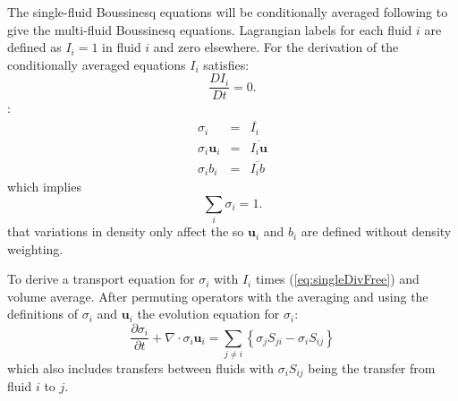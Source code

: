 \documentclass[draft]{agujournal2019}
\begin{document}
The single-fluid Boussinesq equations will be conditionally averaged following  to give the multi-fluid Boussinesq equations. Lagrangian labels for each fluid $i$ are defined as $I_i=1$ in fluid $i$ and zero elsewhere. 
For the derivation of the conditionally averaged equations   $I_i$ satisfies:
\begin{equation}
\frac{DI_i}{Dt}=0.
\label{eq:LagrangianLabel}
\end{equation}
:
\begin{eqnarray}
\sigma_i &=& \overline{I_i} \\
\sigma_i \mathbf{u}_i &=& \overline{I_i \mathbf{u}} \\
\sigma_i b_i &=& \overline{I_i b}
\label{eq:defineFluidFields}
\end{eqnarray}
which implies
\begin{equation}
\sum_{i}\sigma_{i}  =  1.
\label{eq:sumOne}
\end{equation}
 that variations in density only affect the  so $\mathbf{u}_i$ and $b_i$ are defined without density weighting. 

To derive a transport equation for $\sigma_i$ with $I_i$ times (\ref{eq:singleDivFree}) and volume average. After permuting operators with the averaging \cite<as described by>{TWV+18}\add[WM]{,} and using the definitions of $\sigma_i$ and $\mathbf{u}_i$\add[WM]{,}  the evolution equation for $\sigma_i$:
\begin{equation}
\frac{\partial\sigma_{i}}{\partial t}+\nabla\cdot\sigma_{i}\mathbf{u}_{i}  =  \sum_{j\ne i}\left\{ \sigma_{j}S_{ji}-\sigma_{i}S_{ij}\right\}
\label{eq:sigma}
\end{equation}
which also includes transfers between fluids with $\sigma_{i}S_{ij}$ being the transfer from fluid $i$ to $j$.
\end{document}
